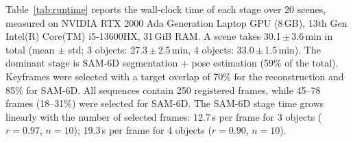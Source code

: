 Table~\ref{tab:runtime} reports the wall-clock time of each stage over 20 scenes, measured on NVIDIA RTX 2000 Ada Generation Laptop GPU (8\,GB), 13th Gen Intel(R) Core(TM) i5-13600HX, 31\,GiB RAM. A scene takes 30.1\,$\pm$\,3.6\,min in total (mean $\pm$ std; 3 objects: 27.3\,$\pm$\,2.5\,min, 4 objects: 33.0\,$\pm$\,1.5\,min). The dominant stage is SAM-6D segmentation + pose estimation (59\% of the total). Keyframes were selected with a target overlap of 70\% for the reconstruction and 85\% for SAM-6D. All sequences contain 250 registered frames, while 45--78 frames (18--31\%) were selected for SAM-6D. The SAM-6D stage time grows linearly with the number of selected frames: 12.7\,s per frame for 3 objects ($r=0.97$, $n=10$); 19.3\,s per frame for 4 objects ($r=0.90$, $n=10$).
